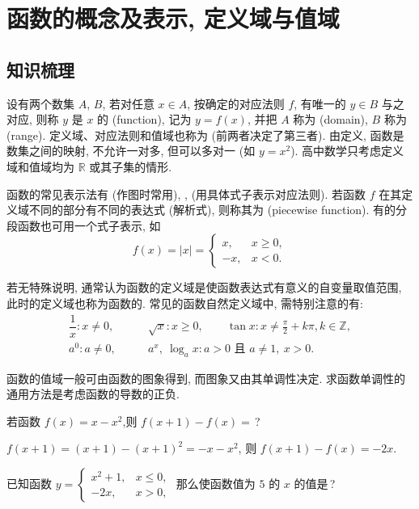   \section{函数的概念及表示, 定义域与值域}

  \subsection{知识梳理}
  设有两个数集 $A$, $B$, 若对任意 $x\in A$, 按确定的对应法则 $f$, 
  有唯一的 $y\in B$ 与之对应, 则称 $y$ 是 $x$ 的 (function), 
  记为 $y=f(x)$, 并把 $A$ 称为 (domain), 
  $B$ 称为 (range). 
  定义域、对应法则和值域也称为 (前两者决定了第三者).
  由定义, 函数是数集之间的映射, 不允许一对多, 但可以多对一 (如 $y=x^2$). 
  高中数学只考虑定义域和值域均为 $\mathbb{R}$ 或其子集的情形.
  
  函数的常见表示法有 (作图时常用), ,  (用具体式子表示对应法则).
  若函数 $f$ 在其定义域不同的部分有不同的表达式 (解析式), 则称其为 (piecewise function). 有的分段函数也可用一个式子表示, 如
  \[f(x)=|x|=\begin{cases}x,& x\geqslant 0,\\ -x,& x<0.\end{cases}\]
  
  若无特殊说明, 通常认为函数的定义域是使函数表达式有意义的自变量取值范围, 
  此时的定义域也称为函数的. 常见的函数自然定义域中, 需特别注意的有:
  \begin{align*}
    \dfrac1x\colon x\neq 0,\quad 
    & \quad\sqrt{x}\colon x\geqslant 0,
    \qquad \tan x\colon x\neq \frac\pi2+k\pi, k\in\mathbb{Z},\\
    a^0\colon a\neq 0,\quad 
    & \quad a^x,\ \log_a x\colon a>0 \text{ 且\ }a\neq 1,\ x>0.
  \end{align*}
  
  函数的值域一般可由函数的图象得到, 而图象又由其单调性决定. 
  求函数单调性的通用方法是考虑函数的导数的正负. 
  
  \lianxi
  \begin{exercise}
    若函数 $f(x)=x-x^2$,则 $f(x+1)-f(x)=$\,?
  \end{exercise}

  \beginsolution
    $f(x+1)=(x+1)-(x+1)^2=-x-x^2$, 则 $f(x+1)-f(x)=-2x$.
  \endsolution
  
  \begin{exercise}
    已知函数 $y=\begin{cases}
      x^2+1, &x\leqslant 0,\\
      -2x,   &x>0,
      \end{cases}$
    那么使函数值为 $5$ 的 $x$ 的值是\,?
  \end{exercise}

